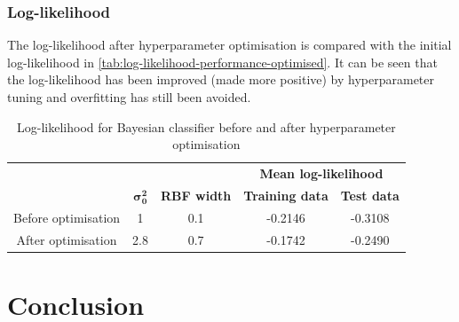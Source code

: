 \documentclass[a4paper]{article}
\begin{document}
    \subsubsection{Log-likelihood}
    The log-likelihood after hyperparameter optimisation is compared with the initial log-likelihood in \autoref{tab:log-likelihood-performance-optimised}.
    It can be seen that the log-likelihood has been improved (made more positive) by hyperparameter tuning and overfitting has still been avoided.
    \begin{table}[h!]
        \centering
        \begin{tabular}{c c c c c}
            & & & \multicolumn{2}{c}{\textbf{Mean log-likelihood}} \\
            &  $\bm{\sigma_0^2}$ & \textbf{RBF width} & \textbf{Training data} & \textbf{Test data} \\
            \hline
            Before optimisation & 1 & 0.1 & -0.2146 & -0.3108 \\
            After optimisation & 2.8 & 0.7 & -0.1742 & -0.2490
        \end{tabular}
        \caption{Log-likelihood for Bayesian classifier before and after hyperparameter optimisation}
        \label{tab:log-likelihood-performance-optimised}
    \end{table}

    \section{Conclusion}
\end{document}
